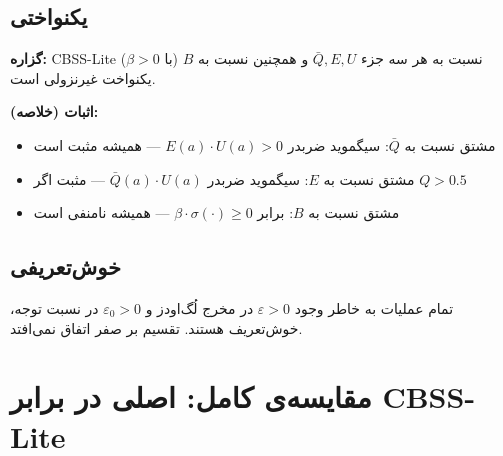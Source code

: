 \documentclass[12pt, a4paper]{article}
\newcommand{\en}[1]{\textenglish{#1}}
\newcommand{\param}[1]{\textcolor{accent}{\texttt{#1}}}
\begin{document}
\subsection{یکنواختی}

\begin{infobox}
\textbf{گزاره:} \en{CBSS-Lite} نسبت به هر سه جزء \param{$\bar{Q}, E, U$} و همچنین نسبت به \param{$B$} (با \param{$\beta > 0$}) یکنواخت غیرنزولی است.

\textbf{اثبات (خلاصه):} 
\begin{itemize}[leftmargin=*]
  \item مشتق نسبت به \param{$\bar{Q}$}: سیگموید ضربدر \param{$E(a) \cdot U(a) > 0$} --- همیشه مثبت است
  \item مشتق نسبت به \param{$E$}: سیگموید ضربدر \param{$\bar{Q}(a) \cdot U(a)$} --- مثبت اگر \param{$Q > 0.5$}
  \item مشتق نسبت به \param{$B$}: برابر \param{$\beta \cdot \sigma(\cdot) \geq 0$} --- همیشه نامنفی است
\end{itemize}
\end{infobox}

\subsection{خوش‌تعریفی}

\begin{infobox}
تمام عملیات به خاطر وجود \param{$\varepsilon > 0$} در مخرج لُگ‌اودز و \param{$\varepsilon_0 > 0$} در نسبت توجه، خوش‌تعریف هستند. تقسیم بر صفر اتفاق نمی‌افتد.
\end{infobox}

\section{مقایسه‌ی کامل: اصلی در برابر \en{CBSS-Lite}}
\end{document}
